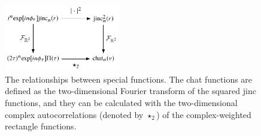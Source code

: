\documentclass[]{osa-article}
\begin{document}
\begin{figure}[h]
 \centering
   \centering
   \includegraphics[width = 0.45\textwidth]{../figures/special/special.pdf}
   \caption{The relationships between special functions. The chat functions are
     defined as the two-dimensional Fourier transform of the squared jinc
     functions, and they can be calculated with the two-dimensional complex
     autocorrelations (denoted by $\star_2$) of the complex-weighted rectangle
     functions.}
   \label{fig:special}
 \end{figure}
\end{document}
